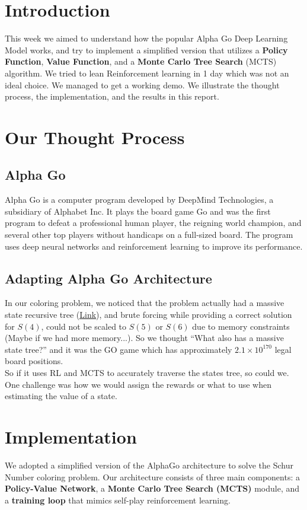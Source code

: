 \documentclass[12pt]{article}
\begin{document}

\tableofcontents
\newpage

\section{Introduction}
This week we aimed to understand how the popular Alpha Go Deep Learning Model works, and try to implement a simplified version that utilizes a \textbf{Policy Function}, \textbf{Value Function}, and a \textbf{Monte Carlo Tree Search} (MCTS) algorithm. 
We tried to lean Reinforcement learning in 1 day which was not an ideal choice. We managed to get a working demo. We illustrate the thought process, the implementation, and the results in this report.

\section{Our Thought Process}
\subsection{Alpha Go}
Alpha Go is a computer program developed by DeepMind Technologies, a subsidiary of Alphabet Inc. It plays the board game Go and was the first program to defeat a professional human player, the reigning world champion, and several other top players without handicaps on a full-sized board. The program uses deep neural networks and reinforcement learning to improve its performance.
\subsection{Adapting Alpha Go Architecture}
In our coloring problem, we noticed that the problem actually had a massive state recursive tree (\href{https://github.com/Abdulrhman-shaheen/CSE326-Schur-Numbers-/blob/master/Week8/tex/images/recursionTree.png}{\underline{Link}}), and brute forcing while providing a correct solution for $S(4)$, could not be scaled to $S(5)$ or $S(6)$ due to memory constraints (Maybe if we had more memory...). So we thought ``What also has a massive state tree?'' and it was the GO game which has approximately $2.1 \times 10^{170}$ legal board positions. \\
So if it uses RL and MCTS to accurately traverse the states tree, so could we. One challenge was how we would assign the rewards or what to use when estimating the value of a state. 


\section{Implementation}
We adopted a simplified version of the AlphaGo architecture to solve the Schur Number coloring problem. Our architecture consists of three main components: a \textbf{Policy-Value Network}, a \textbf{Monte Carlo Tree Search (MCTS)} module, and a \textbf{training loop} that mimics self-play reinforcement learning.
\end{document}
